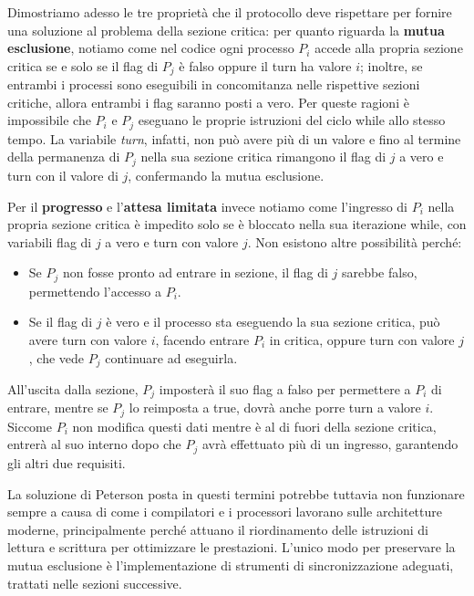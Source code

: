 \noindent Dimostriamo adesso le tre proprietà che il protocollo deve rispettare per fornire una soluzione al problema della sezione critica: per
quanto riguarda la \textbf{mutua esclusione}, notiamo come nel codice ogni processo $P_i$ accede alla propria sezione critica se e solo se il flag di
$P_j$ è falso oppure il turn ha valore $i$; inoltre, se entrambi i processi sono eseguibili in concomitanza nelle rispettive sezioni critiche, allora
entrambi i flag saranno posti a vero. Per queste ragioni è impossibile che $P_i$ e $P_j$ eseguano le proprie istruzioni del ciclo while allo stesso
tempo. La variabile \textit{turn}, infatti, non può avere più di un valore e fino al termine della permanenza di $P_j$ nella sua sezione critica
rimangono il flag di $j$ a vero e turn con il valore di $j$, confermando la mutua esclusione.\par
Per il \textbf{progresso} e l'\textbf{attesa limitata} invece notiamo come l'ingresso di $P_i$ nella propria sezione critica è impedito solo se è
bloccato nella sua iterazione while, con variabili flag di $j$ a vero e turn con valore $j$. Non esistono altre possibilità perché: \begin{itemize}
    \item Se $P_j$ non fosse pronto ad entrare in sezione, il flag di $j$ sarebbe falso, permettendo l'accesso a $P_i$.
    \item Se il flag di $j$ è vero e il processo sta eseguendo la sua sezione critica, può avere turn con valore $i$, facendo entrare $P_i$ in critica,
    oppure turn con valore $j$, che vede $P_j$ continuare ad eseguirla.
\end{itemize}
\noindent All'uscita dalla sezione, $P_j$ imposterà il suo flag a falso per permettere a $P_i$ di entrare, mentre se $P_j$ lo reimposta a true, dovrà
anche porre turn a valore $i$. Siccome $P_i$ non modifica questi dati mentre è al di fuori della sezione critica, entrerà al suo interno dopo che $P_j$
avrà effettuato più di un ingresso, garantendo gli altri due requisiti.\par
La soluzione di Peterson posta in questi termini potrebbe tuttavia non funzionare sempre a causa di come i compilatori e i processori lavorano sulle
architetture moderne, principalmente perché attuano il riordinamento delle istruzioni di lettura e scrittura per ottimizzare le prestazioni. L'unico
modo per preservare la mutua esclusione è l'implementazione di strumenti di sincronizzazione adeguati, trattati nelle sezioni successive.

%

